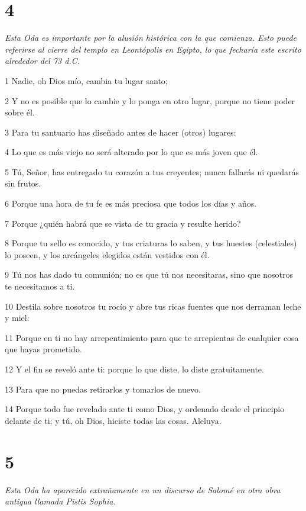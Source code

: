 \chapter{4}

\par \textit{Esta Oda es importante por la alusión histórica con la que comienza. Esto puede referirse al cierre del templo en Leontópolis en Egipto, lo que fecharía este escrito alrededor del 73 d.C.}

\par 1 Nadie, oh Dios mío, cambia tu lugar santo;
\par 2 Y no es posible que lo cambie y lo ponga en otro lugar, porque no tiene poder sobre él.
\par 3 Para tu santuario has diseñado antes de hacer (otros) lugares:
\par 4 Lo que es más viejo no será alterado por lo que es más joven que él.
\par 5 Tú, Señor, has entregado tu corazón a tus creyentes; nunca fallarás ni quedarás sin frutos.
\par 6 Porque una hora de tu fe es más preciosa que todos los días y años.
\par 7 Porque ¿quién habrá que se vista de tu gracia y resulte herido?
\par 8 Porque tu sello es conocido, y tus criaturas lo saben, y tus huestes (celestiales) lo poseen, y los arcángeles elegidos están vestidos con él.
\par 9 Tú nos has dado tu comunión; no es que tú nos necesitaras, sino que nosotros te necesitamos a ti.
\par 10 Destila sobre nosotros tu rocío y abre tus ricas fuentes que nos derraman leche y miel:
\par 11 Porque en ti no hay arrepentimiento para que te arrepientas de cualquier cosa que hayas prometido.
\par 12 Y el fin se reveló ante ti: porque lo que diste, lo diste gratuitamente.
\par 13 Para que no puedas retirarlos y tomarlos de nuevo.
\par 14 Porque todo fue revelado ante ti como Dios, y ordenado desde el principio delante de ti; y tú, oh Dios, hiciste todas las cosas. Aleluya.

\chapter{5}

\par \textit{Esta Oda ha aparecido extrañamente en un discurso de Salomé en otra obra antigua llamada Pistis Sophia.}

